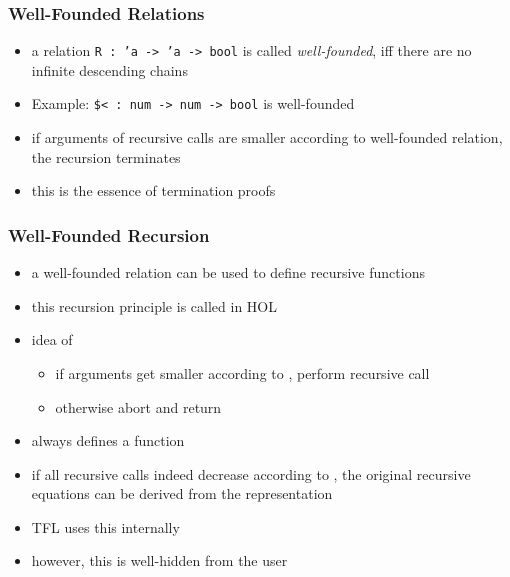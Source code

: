 \begin{frame}
\frametitle{Well-Founded Relations}
\begin{itemize}
\item a relation \texttt{R : 'a -> 'a -> bool} is called \emph{well-founded}, iff
there are no infinite descending chains\\[.5em]
\bigskip
\item Example: \texttt{\$< :\ num -> num -> bool} is well-founded
\item if arguments of recursive calls are smaller according to well-founded relation,
the recursion terminates
\item this is the essence of termination proofs
\end{itemize}
\end{frame}


\begin{frame}
\frametitle{Well-Founded Recursion}
\begin{itemize}
\item a well-founded relation  can be used to define recursive functions
\item this recursion principle is called  in HOL
\item idea of 
\begin{itemize}
\item if arguments get smaller according to , perform recursive call
\item otherwise abort and return 
\end{itemize}
\item {} always defines a function
\item if all recursive calls indeed decrease according to , the original recursive
      equations can be derived from the  representation
\item TFL uses this internally
\item however, this is well-hidden from the user
\end{itemize}
\end{frame}




